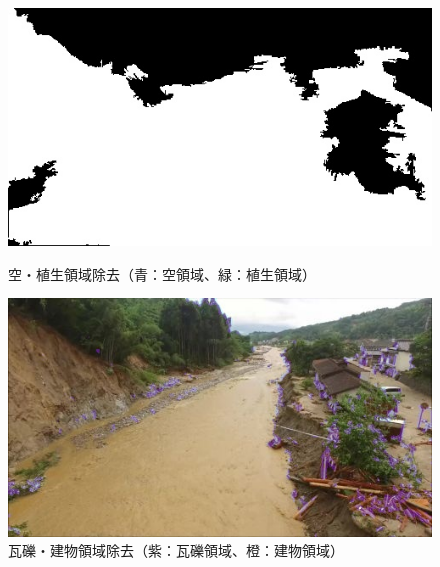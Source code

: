 \documentclass[a4paper, twocolumn, xelatex, 10pt, ja=standard, Ligatures=TeX]{bxjsarticle}
\begin{document}
		\begin{figure}[t]
			\begin{minipage}{0.48\hsize}
				\centering
				\includegraphics[width=\linewidth]{img/maskNature.jpg}
				\caption{空・植生領域除去（青：空領域、緑：植生領域）}
				\label{img05}
			\end{minipage}
			\begin{minipage}{0.48\hsize}
				\centering
				\includegraphics[width=\linewidth]{img/artifact.jpg}
				\caption{瓦礫・建物領域除去（紫：瓦礫領域、橙：建物領域）}
				\label{img06}
			\end{minipage}
		\end{figure}
\end{document}
